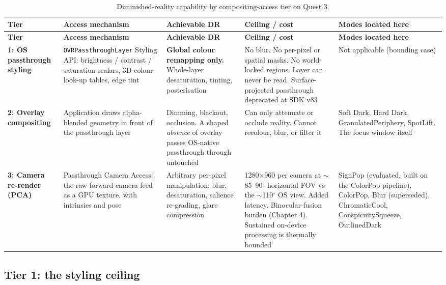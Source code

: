 \begingroup
\setlength{\tabcolsep}{4pt}\small
\begin{longtable}{p{}p{}p{}p{}p{}}
\caption{Diminished-reality capability by compositing-access tier on Quest 3.}
\label{tab:tiers} \\
\hline
\textbf{Tier} & \textbf{Access mechanism} & \textbf{Achievable DR} & \textbf{Ceiling / cost} & \textbf{Modes located here} \\
\hline
\endfirsthead
\hline
\textbf{Tier} & \textbf{Access mechanism} & \textbf{Achievable DR} & \textbf{Ceiling / cost} & \textbf{Modes located here} \\
\hline
\endhead
\textbf{1: OS pass\-through styling} &
\texttt{OVRPass\-through\-Layer} Styling API: brightness / contrast / saturation scalars, 3D colour look-up tables, edge tint &
\textbf{Global colour remapping only.} Whole-layer desaturation, tinting, posterisation &
No blur. No per-pixel or spatial masks. No world-locked regions. Layer can never be read. Surface-projected passthrough deprecated at SDK v83 &
Not applicable (bounding case) \\
\hline
\textbf{2: Overlay compositing} &
Application draws alpha-blended geometry in front of the passthrough layer &
Dimming, blackout, occlusion. A shaped \textit{absence} of overlay passes OS-native passthrough through untouched &
Can only attenuate or occlude reality. Cannot recolour, blur, or filter it &
Soft Dark, Hard Dark, GranulatedPeriphery, SpotLift. The focus window itself \\
\hline
\textbf{3: Camera re-render (PCA)} &
Passthrough Camera Access: the raw forward camera feed as a GPU texture, with intrinsics and pose &
Arbitrary per-pixel manipulation: blur, desaturation, salience re-grading, glare compression &
1280$\times$960 per camera at $\sim$85–90$^{\circ}$ horizontal FOV vs the $\sim$110$^{\circ}$ OS view. Added latency. Binocular-fusion burden (Chapter 4). Sustained on-device processing is thermally bounded &
SignPop (evaluated, built on the ColorPop pipeline), ColorPop, Blur (superseded), Chromatic\-Cool, Conspicuity\-Squeeze, Outlined\-Dark \\
\hline
\end{longtable}
\endgroup

\subsection{Tier 1: the styling ceiling}

